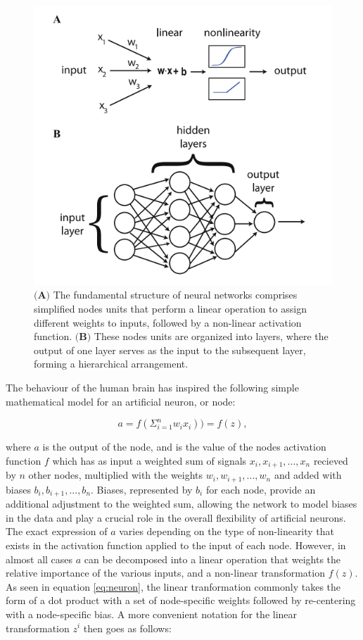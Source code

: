 \documentclass[a4paper, UKenglish, 11pt]{uiomaster}
\begin{document}
\begin{figure}
    \centering
    \includegraphics[width=\linewidth]{figures/basic_architecture.png}
    \caption{$\textbf{(A)}$ The fundamental structure of neural networks comprises simplified nodes units that perform a linear operation to assign different weights to inputs, followed by a non-linear activation function. $\textbf{(B)}$ These nodes units are organized into layers, where the output of one layer serves as the input to the subsequent layer, forming a hierarchical arrangement. }
    \label{fig:NN_basic_architecture}
\end{figure}

The behaviour of the human brain has inspired the following simple mathematical model for an artificial neuron, or node:

\begin{equation}
  a = f \left( \Sigma_{i=1}^n w_ix_i \right) ) = f(z),
\label{eq:neuron}
\end{equation}

where $a$ is the output of the node, and is the value of the nodes activation function $f$ which has as input a weighted sum of signals $x_i, x_{i+1},...,x_n$ recieved by $n$ other nodes, multiplied with the weights $w_i, w_{i+1}, ..., w_{n}$ and added with biases $b_i, b_{i+1}, ..., b_{n}$. Biases, represented by $b_i$ for each node, provide an additional adjustment to the weighted sum, allowing the network to model biases in the data and play a crucial role in the overall flexibility of artificial neurons. The exact expression of $a$ varies depending on the type of non-linearity that exists in the activation function applied to the input of each node. However, in almost all cases $a$ can be decomposed into a linear operation that weights the relative importance of the various inputs, and a non-linear transformation $f(z)$. As seen in equation \ref{eq:neuron}, the linear tranformation commonly takes the form of a dot product with a set of node-specific weights followed by re-centering with a node-specific bias. A more convenient notation for the linear transformation $z^{i}$ then goes as follows:
\end{document}
